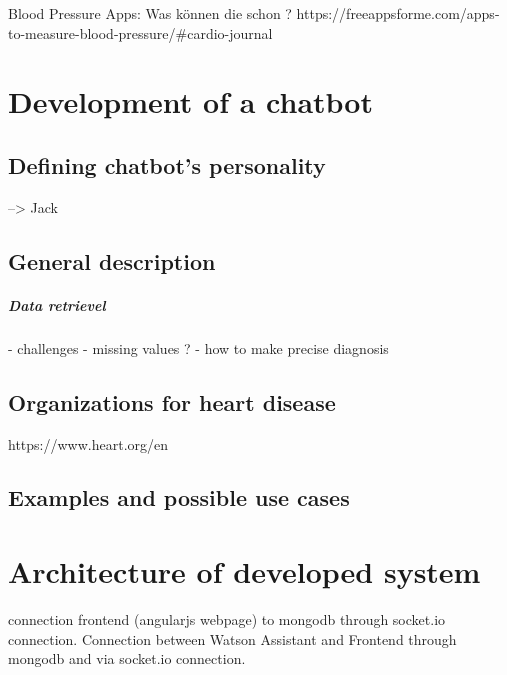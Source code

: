 Blood Pressure Apps:
Was können die schon ? 
https://freeappsforme.com/apps-to-measure-blood-pressure/#cardio-journal


\chapter{Development of a chatbot}\label{chatbot}

\section{Defining chatbot's personality}
--> Jack

\section{General description}\label{general_description}

\paragraph{Data retrievel}

- challenges 
- missing values ? 
- how to make precise diagnosis


\section{Organizations for heart disease}
https://www.heart.org/en

\section{Examples and possible use cases}\label{examples}
  
              
\chapter{Architecture of developed system }\label{archtiecture}

connection frontend (angularjs webpage) to mongodb through socket.io connection.
Connection between Watson Assistant and Frontend through mongodb and via socket.io connection.



